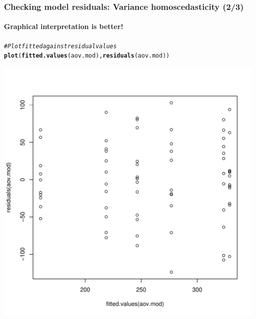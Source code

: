 \documentclass{beamer}\usepackage[]{graphicx}\usepackage[]{color}
\makeatletter
\newcommand{\hlcom}[1]{\textcolor[rgb]{0.678,0.584,0.686}{\textit{#1}}}%
\newcommand{\hlstd}[1]{\textcolor[rgb]{0.345,0.345,0.345}{#1}}%
\newcommand{\hlkwd}[1]{\textcolor[rgb]{0.737,0.353,0.396}{\textbf{#1}}}%
\newenvironment{kframe}{%
 \def\at@end@of@kframe{}%
 \ifinner\ifhmode%
  \def\at@end@of@kframe{\end{minipage}}%
  \begin{minipage}{\columnwidth}%
 \fi\fi%
 \def\FrameCommand##1{\hskip\@totalleftmargin \hskip-\fboxsep
 \colorbox{shadecolor}{##1}\hskip-\fboxsep
     \hskip-\linewidth \hskip-\@totalleftmargin \hskip\columnwidth}%
 \MakeFramed {\advance\hsize-\width
   \@totalleftmargin\z@ \linewidth\hsize
   \@setminipage}}%
 {\par\unskip\endMakeFramed%
 \at@end@of@kframe}
\newenvironment{knitrout}{}{} %
\makeatother
\begin{document}
{{{%

\begin{frame}[fragile]
\frametitle{Checking model residuals: Variance homoscedasticity (2/3)}
\framesubtitle{Graphical interpretation is better!}
\begin{knitrout}\scriptsize
{}\color{fgcolor}\begin{kframe}
\begin{alltt}
\hlcom{# Plot fitted against residual values}
\hlkwd{plot}\hlstd{(}\hlkwd{fitted.values}\hlstd{(aov.mod),} \hlkwd{residuals}\hlstd{(aov.mod))}
\end{alltt}
\end{kframe}

{\centering \includegraphics[width=0.6\linewidth]{figure/unnamed-chunk-46-1} 

}



\end{knitrout}
\end{frame}


}}}
\end{document}
